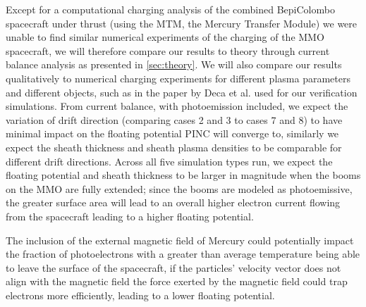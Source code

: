 Except for a computational charging analysis of the combined BepiColombo spacecraft under thrust (using the MTM, the Mercury Transfer Module)  we were unable to find similar numerical experiments of the charging of the MMO spacecraft, we will therefore compare our results to theory through current balance analysis as presented in \ref{sec:theory}. We will also compare our results qualitatively to numerical charging experiments for different plasma parameters and different objects, such as in the paper by Deca et al. \parencite{Deca2013} used for our verification simulations.
From current balance, with photoemission included, we expect the variation of drift direction (comparing cases 2 and 3 to cases 7 and 8) to have minimal impact on the floating potential PINC will converge to, similarly we expect the sheath thickness and sheath plasma densities to be comparable for different drift directions. Across all five simulation types run, we expect the floating potential and sheath thickness to be larger in magnitude when the booms on the MMO are fully extended; since the booms are modeled as photoemissive, the greater surface area will lead to an overall higher electron current flowing from the spacecraft leading to a higher floating potential. 

The inclusion of the external magnetic field of Mercury could potentially impact the fraction of photoelectrons with a greater than average temperature being able to leave the surface of the spacecraft, if the particles' velocity vector does not align with the magnetic field the force exerted by the magnetic field could trap electrons more efficiently, leading to a lower floating potential.        

